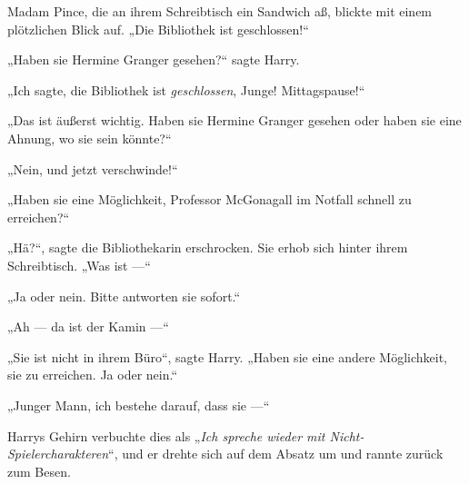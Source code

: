 Madam Pince, die an ihrem Schreibtisch ein Sandwich aß, blickte mit einem plötzlichen Blick auf.
„Die Bibliothek ist geschlossen!“

„Haben sie Hermine Granger gesehen?“ sagte Harry.

„Ich sagte, die Bibliothek ist \emph{geschlossen}, Junge! Mittagspause!“

„Das ist äußerst wichtig. Haben sie Hermine Granger gesehen oder haben sie eine Ahnung, wo sie sein könnte?“

„Nein, und jetzt verschwinde!“

„Haben sie eine Möglichkeit, Professor McGonagall im Notfall schnell zu erreichen?“

„Hä?“, sagte die Bibliothekarin erschrocken. Sie erhob sich hinter ihrem Schreibtisch.
„Was ist —“

„Ja oder nein. Bitte antworten sie sofort.“

„Ah — da ist der Kamin —“

„Sie ist nicht in ihrem Büro“, sagte Harry.
„Haben sie eine andere Möglichkeit, sie zu erreichen. Ja oder nein.“

„Junger Mann, ich bestehe darauf, dass sie —“

Harrys Gehirn verbuchte dies als
„\emph{Ich spreche wieder mit Nicht-Spielercharakteren}“, und er drehte sich auf dem Absatz um und rannte zurück zum Besen.


